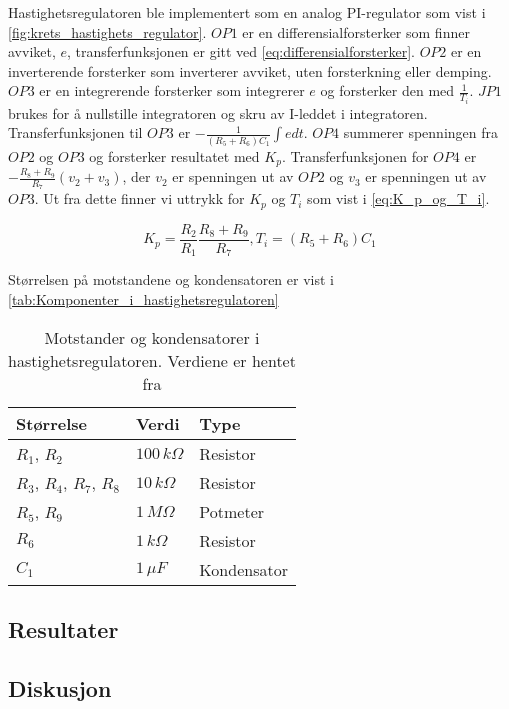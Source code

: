 Hastighetsregulatoren ble implementert som en analog PI-regulator som vist i \autoref{fig:krets_hastighets_regulator}. $OP1$ er en differensialforsterker som finner avviket, $e$, transferfunksjonen er gitt ved \autoref{eq:differensialforsterker}.
$OP2$ er en inverterende forsterker som inverterer avviket, uten forsterkning eller demping.
$OP3$ er en integrerende forsterker som integrerer $e$ og forsterker den med $\frac{1}{T_i}$. $JP1$ brukes for å nullstille integratoren og skru av I-leddet i integratoren. Transferfunksjonen til $OP3$ er $-\frac{1}{(R_5 + R_6) C_1} \int e dt$.
$OP4$ summerer spenningen fra $OP2$ og $OP3$ og forsterker resultatet med $K_p$. Transferfunksjonen for $OP4$ er $-\frac{R_8 + R_9}{R_7}(v_2 + v_3)$, der $v_2$ er spenningen ut av $OP2$ og $v_3$ er spenningen ut av $OP3$. Ut fra dette finner vi uttrykk for $K_p$ og $T_i$ som vist i \autoref{eq:K_p_og_T_i}.

\begin{equation}
    \label{eq:K_p_og_T_i}
    K_p = \frac{R_2}{R_1} \frac{R_8 + R_9}{R_7},
    T_i = (R_5 + R_6) C_1
\end{equation}

Størrelsen på motstandene og kondensatoren er vist i \autoref{tab:Komponenter_i_hastighetsregulatoren}

\begin{table}
    \centering
    \caption{Motstander og kondensatorer i hastighetsregulatoren. Verdiene er hentet fra \cite{AnalogMotorlabbOppgaver}}
    \begin{tabular}{lll}
        \toprule
        Størrelse & Verdi & Type \\
		\midrule
        $R_1$, $R_2$ & $100\,k\Omega$ & Resistor\\
        $R_3$, $R_4$, $R_7$, $R_8$ & $10\,k\Omega$ & Resistor \\
        $R_5$, $R_9$ & $1\,M\Omega$ & Potmeter \\
        $R_6$ & $1\,k\Omega$ & Resistor \\
        $C_1$ & $1\,\mu F$ & Kondensator \\
        \bottomrule
    \end{tabular}
    \label{tab:Komponenter_i_hastighetsregulatoren}
\end{table}

\subsection{Resultater}



\subsection{Diskusjon}

